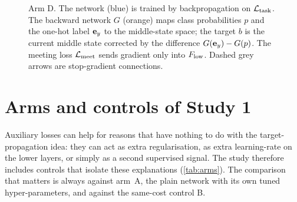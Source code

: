 \begin{figure}[t]
\centering
\resizebox{\textwidth}{!}{}
\caption{Arm D. The network (blue) is trained by backpropagation on $\mathcal{L}_{\mathrm{task}}$. The backward network $G$ (orange) maps class probabilities $p$ and the one-hot label $\mathbf{e}_y$ to the middle-state space; the target $b$ is the current middle state corrected by the difference $G(\mathbf{e}_y)-G(p)$. The meeting loss $\mathcal{L}_{\mathrm{meet}}$ sends gradient only into $F_{\mathrm{low}}$. Dashed grey arrows are stop-gradient connections.}
\label{fig:meeting}
\end{figure}

\section{Arms and controls of Study 1}\label{sec:arms}
Auxiliary losses can help for reasons that have nothing to do with the target-propagation idea: they can act as extra regularisation, as extra learning-rate on the lower layers, or simply as a second supervised signal. The study therefore includes controls that isolate these explanations (\cref{tab:arms}). The comparison that matters is always against arm~A, the plain network with its own tuned hyper-parameters, and against the same-cost control B.

